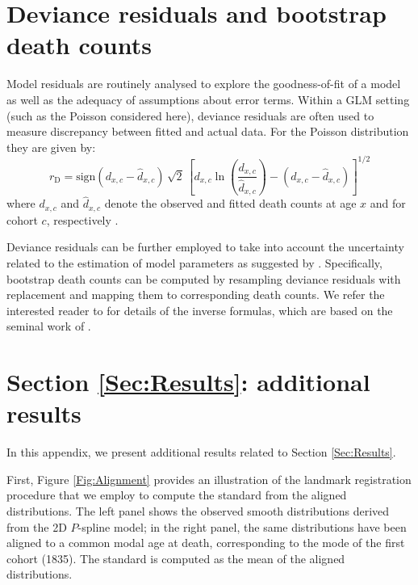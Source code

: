 \documentclass[11pt, a4paper]{article}
\begin{document}
\bigskip


 

\bigskip
\appendix
{}

\section{Deviance residuals and bootstrap death counts}
\label{Appendix:ResidualDeath}     
Model residuals are routinely analysed to explore the goodness-of-fit of a model as well as the adequacy of assumptions about error terms. Within a GLM setting (such as the Poisson considered here), deviance residuals are often used to measure discrepancy between fitted and actual data. For the Poisson distribution they are given by: 
\begin{equation}\label{Eq:DevRes}
r_{\mathrm{D}}= \mathrm{sign} (d_{x,c}-\hat{d}_{x,c}) \, \sqrt{2} \, 
\left[d_{x,c} \ln \left(\frac{d_{x,c}}{\hat{d}_{x,c}}\right) - 
\left(d_{x,c}-\hat{d}_{x,c}\right)
\right]^{1/2}
\end{equation}
where $d_{x,c}$ and $\hat{d}_{x,c}$ denote the observed and fitted death counts at age $x$ and for cohort $c$, respectively \citep{mccullagh1989glm}. 

Deviance residuals can be further employed to take into account the uncertainty related to the estimation of model parameters as suggested by \cite{koissi2006evaluating}. Specifically, bootstrap death counts can be computed by resampling deviance residuals with replacement and mapping them to corresponding death counts. We refer the interested reader to \cite{renshaw2008simulation} for details of the inverse formulas, which are based on the seminal work of \cite{efron1994introduction}.  

\section{Section \ref{Sec:Results}: additional results}
\label{Appendix:AdditResults}     

In this appendix, we present additional results related to Section \ref{Sec:Results}. 

First, Figure \ref{Fig:Alignment} provides an illustration of the landmark registration procedure that we employ to compute the standard from the aligned distributions. The left panel shows the observed smooth distributions derived from the 2D $P$-spline model; in the right panel, the same distributions have been aligned to a common modal age at death, corresponding to the mode of the first cohort (1835). The standard is computed as the mean of the aligned distributions.
\end{document}

